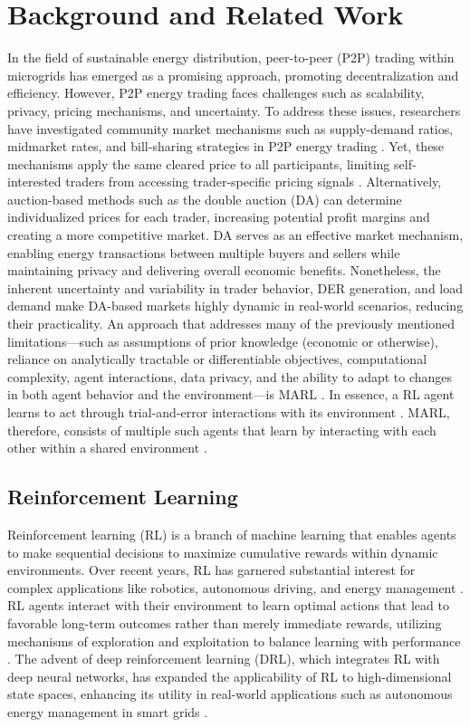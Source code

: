 \documentclass[preprint,12pt]{elsarticle}
\begin{document}
\section{Background and Related Work}


In the field of sustainable energy distribution, peer-to-peer (P2P) trading within microgrids has emerged as a promising approach, promoting decentralization and efficiency. However, P2P energy trading faces challenges such as scalability, privacy, pricing mechanisms, and uncertainty. To address these issues, researchers have investigated community market mechanisms such as supply-demand ratios, midmarket rates, and bill-sharing strategies in P2P energy trading \cite{zhou2018evaluation}. Yet, these mechanisms apply the same cleared price to all participants, limiting self-interested traders from accessing trader-specific pricing signals \cite{long2017peer}. Alternatively, auction-based methods such as the double auction (DA) \cite{zheng2024multi} can determine individualized prices for each trader, increasing potential profit margins and creating a more competitive market. DA serves as an effective market mechanism, enabling energy transactions between multiple buyers and sellers while maintaining privacy and delivering overall economic benefits. Nonetheless, the inherent uncertainty and variability in trader behavior, DER generation, and load demand make DA-based markets highly dynamic in real-world scenarios, reducing their practicality. An approach that addresses many of the previously mentioned limitations—such as assumptions of prior knowledge (economic or otherwise), reliance on analytically tractable or differentiable objectives, computational complexity, agent interactions, data privacy, and the ability to adapt to changes in both agent behavior and the environment—is MARL \cite{zheng2022ai}. In essence, a RL agent learns to act through trial-and-error interactions with its environment \cite{may2023multi}. MARL, therefore, consists of multiple such agents that learn by interacting with each other within a shared environment \cite{johanson2022emergent}.


\subsection{Reinforcement Learning}

Reinforcement learning (RL) is a branch of machine learning that enables agents to make sequential decisions to maximize cumulative rewards within dynamic environments. Over recent years, RL has garnered substantial interest for complex applications like robotics, autonomous driving, and energy management \cite{arulkumaran2017brief}. RL agents interact with their environment to learn optimal actions that lead to favorable long-term outcomes rather than merely immediate rewards, utilizing mechanisms of exploration and exploitation to balance learning with performance \cite{mousavi2018deep}. The advent of deep reinforcement learning (DRL), which integrates RL with deep neural networks, has expanded the applicability of RL to high-dimensional state spaces, enhancing its utility in real-world applications such as autonomous energy management in smart grids \cite{franccois2018introduction}.
\end{document}
